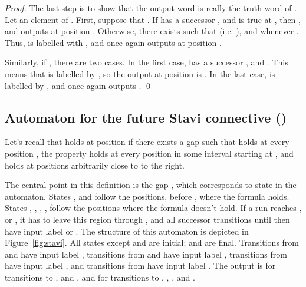 \documentclass[envcountsame]{fsttcs-ps}
\begin{document}
\begin{proof}
The last step is to show that the output word is really the truth word of
.
Let  an element of .
First, suppose that .  If  has a successor ,
and  is true at , then , and  outputs  at
position .  Otherwise, there exists  such that  (i.e.
), and  whenever .  Thus,  is labelled
with , and  once again outputs  at position .


Similarly, if , there are two cases.
In the first case,  has a successor , and .  This means
that  is labelled by , so the output at position  is .
In the last case,  is labelled by , and once again 
outputs .
\qed\end{proof}

\subsection{Automaton for the future Stavi connective ()}

Let's recall that  holds at position  if there exists a
gap  such that  holds at every position , the property
 holds at every position in some interval starting at , and
 holds at positions arbitrarily close to  to the right.

The central point in this definition is the gap , which corresponds to
state  in the automaton.  States ,  and  follow
the positions, before , where the formula holds.  States ,
, , ,  follow the positions where the formula
doesn't hold.
If a run reaches ,  or , it has to leave this region
through , and all successor transitions until then have input label
 or .  The structure of this automaton is depicted in
Figure~\ref{fig:stavi}.
All states except  and  are initial;  and 
are final.  Transitions from  and  have input label ,
transitions from  and  have input label , transitions from
 have input label , and transitions from  have input
label .  The output is  for transitions to ,  and
, and  for transitions to , , ,  and
.
\end{document}
